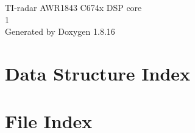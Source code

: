 \let\mypdfximage\pdfximage\def\pdfximage{\immediate\mypdfximage}\documentclass[twoside]{book}
\newcommand{\+}{\discretionary{\mbox{\scriptsize$\hookleftarrow$}}{}{}}
\newcommand{\clearemptydoublepage}{%
  \newpage{\pagestyle{empty}\cleardoublepage}%
}
\begin{document}
\begin{titlepage}
\vspace*{7cm}
\begin{center}%
{\Large T\+I-\/radar A\+W\+R1843 C674x D\+SP core \\[1ex]\large 1 }\\
\vspace*{1cm}
{\large Generated by Doxygen 1.8.16}\\
\end{center}
\end{titlepage}
\clearemptydoublepage
{}
\tableofcontents
\clearemptydoublepage
{}

\chapter{Data Structure Index}

\chapter{File Index}

\end{document}
